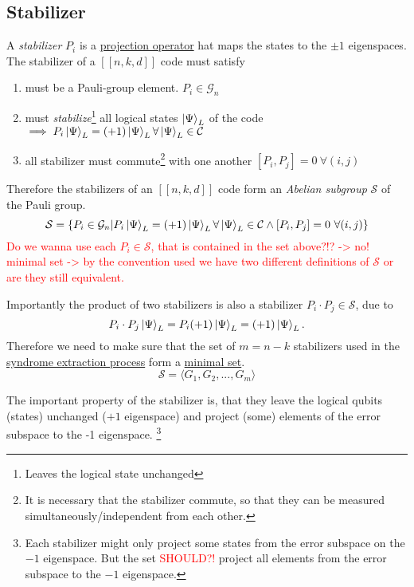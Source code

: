 \subsection{Stabilizer}\label{sec:basic.qc.stabilizer}
A \textit{stabilizer} 
$P_i$ is a 
\hyperref[sec:basic.math.projection_operator]{projection operator} 
hat maps the states to the $\pm 1$ eigenspaces. 
The stabilizer of a $[[n,k,d]]$ code must satisfy
\begin{enumerate}
    \item must be a Pauli-group element. $P_i \in \mathcal{G}_n$ 
    \item must \textit{stabilize}\footnote{Leaves the logical state unchanged} all logical states $\ket{\Psi}_L$ of the code \\
    $\implies P_i \ket{\Psi}_L = (+1) \ket{\Psi}_L \forall \ket{\Psi}_L \in \mathcal{C} $ 
    \item all stabilizer must commute\footnote{
It is necessary that the stabilizer commute, so that they can be measured simultaneously/independent from each other. 
    } with one another $[P_i,P_j]=0 \ \forall (i,j)$
\end{enumerate}
Therefore the stabilizers of an $[[n,k,d]]$ code form an \textit{Abelian subgroup} $\mathcal{S}$ of the Pauli group. \cite{QECintro}
\begin{equation}
    \mathcal{S} = \{ P_i \in \mathcal{G}_n | P_i \ket{\Psi}_L = (+1) \ket{\Psi}_L \forall \ket{\Psi}_L\in \mathcal{C} \land [P_i,P_j]=0 \ \forall(i,j)\}
\end{equation}
\textcolor{red}{Do we wanna use each $P_i \in \mathcal{S}$, that is contained in the set above?!? -> no! minimal set -> by the convention used we have two different definitions of $\mathcal{S}$ or are they still equivalent.}

Importantly the product of two stabilizers is also a stabilizer $P_i \cdot P_j \in \mathcal{S}$, due to
\begin{equation}
    P_i \cdot P_j  \ket{\Psi}_L = P_i (+1) \ket{\Psi}_L = (+1) \ket{\Psi}_L.
\end{equation}
Therefore we need to make sure that the set of $m=n-k$ stabilizers used in the \hyperref[sec:basic.qc.syndrome_extraction_process]{syndrome extraction process}
form a \hyperref[sec:basic.math.minimal_set]{minimal set}. 
\begin{equation}
    \mathcal{S}= \langle G_1, G_2, ..., G_m\rangle
\end{equation}

The important property of the stabilizer is, that they leave the logical qubits (states) unchanged ($+1$ eigenspace) 
and project (some) elements of the error subspace to the -1 eigenspace.
\footnote{
    Each stabilizer might only project some states from the error subspace on the $-1$ eigenspace. 
    But the set \textcolor{red}{SHOULD?!} project all elements from the error subspace to the $-1$ eigenspace. 
} \cite{QECintro}



